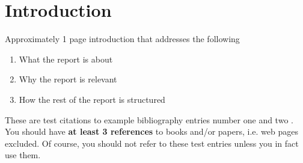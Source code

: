 \chapter{Introduction}
Approximately 1 page introduction that addresses the following
\begin{enumerate}
\item What the report is about
\item Why the report is relevant
\item How the rest of the report is structured
\end{enumerate}

These are test citations to example bibliography entries number one
\cite{1989_graham_1} and two \cite{2003_simpson_1}. You should have
\textbf{at least 3 references} to books and/or papers, i.e. web pages
excluded. Of course, you should not refer to these test entries unless
you in fact use them.